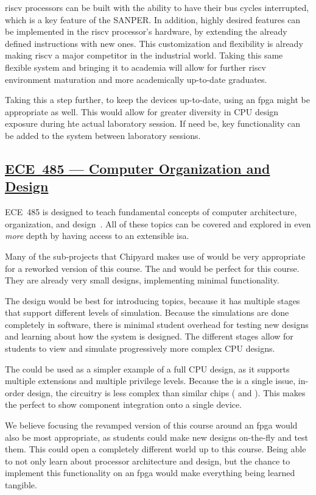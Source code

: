 \Gls{riscv} processors can be built with the ability to have their bus cycles interrupted, which is a key feature of the SANPER.\@
In addition, highly desired features can be implemented in the \Gls{riscv} processor's hardware, by extending the already defined instructions with new ones.
This customization and flexibility is already making \Gls{riscv} a major competitor in the industrial world.
Taking this same flexible system and bringing it to academia will allow for further \Gls{riscv} environment maturation and more academically up-to-date graduates.

Taking this a step further, to keep the devices up-to-date, using an \Gls{fpga} might be appropriate as well.
This would allow for greater diversity in CPU design exposure during hte actual laboratory session.
If need be, key functionality can be added to the system between laboratory sessions.

\subsection{\href{http://bulletin.iit.edu/search/?P=ECE 485}{ECE~485 --- Computer Organization and Design}}\label{sec:ECE_485}
ECE~485 is designed to teach fundamental concepts of computer architecture, organization, and design~\cite{iitECE485}.
All of these topics can be covered and explored in even \emph{more} depth by having access to an \gls{extensible} \Gls{isa}.

Many of the sub-projects that Chipyard makes use of would be very appropriate for a reworked version of this course.
The  and  would be perfect for this course.
They are already very small designs, implementing minimal functionality.

The  design would be best for introducing topics, because it has multiple stages that support different levels of simulation.
Because the simulations are done completely in software, there is minimal student overhead for testing new designs and learning about how the system is designed.
The different stages allow for students to view and simulate progressively more complex CPU designs.

The  could be used as a simpler example of a full CPU design, as it supports multiple extensions and multiple privilege levels.
Because the  is a single issue, in-order design, the circuitry is less complex than similar chips ( and ).
This makes the  perfect to show component integration onto a single device.

We believe focusing the revamped version of this course around an \Gls{fpga} would also be most appropriate, as students could make new designs on-the-fly and test them.
This could open a completely different world up to this course.
Being able to not only learn about processor architecture and design, but the chance to implement this functionality on an \Gls{fpga} would make everything being learned tangible.

